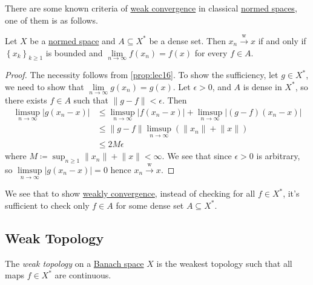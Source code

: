 There are some known criteria of \hyperref[def:weakly-convergence]{weak convergence} in classical \hyperref[def:normed-vector-space]{normed spaces}, one of them is as follows.
\begin{lemma}\label{lma:testing-weak-convergence-on-a-dense-set}
	Let \(X\) be a \hyperref[def:normed-vector-space]{normed space} and \(A \subseteq X^{\ast} \) be a dense set. Then \(x_n \overset{\text{w}}{\to } x\) if and only if \(\left\{ x_k \right\} _{k\geq 1}\) is bounded and \(\lim\limits_{n \to \infty} f(x_n) = f(x)\) for every \(f\in A\).
\end{lemma}
\begin{proof}
	The necessity follows from \autoref{prop:lec16}. To show the sufficiency, let \(g\in X^{\ast} \), we need to show that \(\lim\limits_{n \to \infty} g(x_n) = g(x)\). Let \(\epsilon > 0\), and \(A\) is dense in \(X^{\ast} \), so there exists \(f\in A\) such that \(\left\lVert g-f\right\rVert < \epsilon \). Then
	\[
		\begin{split}
			\limsup_{n \to \infty} \left\vert g(x_n - x) \right\vert
			&\leq \limsup_{n \to \infty} \left\vert f(x_n - x) \right\vert + \limsup_{n \to \infty} \left\vert (g-f)(x_{n} -x ) \right\vert \\
			&\leq \left\lVert g-f\right\rVert \limsup_{n \to \infty} (\lVert x_n  \rVert + \lVert x \rVert) \\
			&\leq 2M\epsilon
		\end{split}
	\]
	where \(M\coloneqq \sup _{n\geq 1} \lVert x_n\rVert + \lVert x \rVert < \infty\). We see that since \(\epsilon > 0\) is arbitrary, so \(\limsup\limits_{n \to \infty} \left\vert g(x_{n} - x ) \right\vert = 0\) hence \(x_n \overset{\text{w}}{\to} x\).
\end{proof}

\begin{note}
	We see that to show \hyperref[def:weakly-convergence]{weakly convergence}, instead of checking for all \(f\in X^{\ast} \), it's sufficient to check only \(f\in A\) for some dense set \(A\subseteq X^{\ast} \).
\end{note}

\subsection{Weak Topology}
\begin{definition}\label{def:weak-topology}
	The \emph{weak topology} on a \hyperref[def:Banach-space]{Banach space} \(X\) is the weakest topology such that all maps \(f\in X^{\ast} \) are continuous.
\end{definition}

